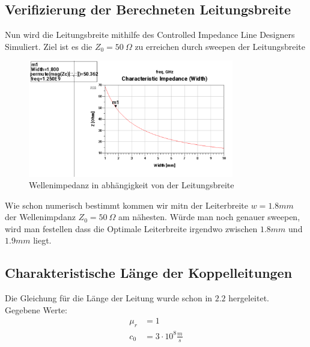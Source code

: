        

    \subsection{Verifizierung der Berechneten Leitungsbreite}
    Nun wird die Leitungsbreite mithilfe des Controlled Impedance Line Designers Simuliert.
    Ziel ist es die $Z_0 = 50~\Omega$ zu erreichen durch sweepen der Leitungsbreite
    \begin{figure}[H]
        \centering
        \includegraphics[width=0.8\textwidth]{Pictures/LeitungsbreitenSweep.png}
        \caption{Wellenimpedanz in abhängigkeit von der Leitungsbreite}
    \end{figure}
    Wie schon numerisch bestimmt kommen wir mitn der Leiterbreite $w=1.8mm$ der Wellenimpdanz $Z_0 = 50~\Omega$
    am nähesten. Würde man noch genauer sweepen, wird man festellen dass die Optimale Leiterbreite irgendwo zwischen
    $1.8mm$ und $1.9mm$ liegt.

        \subsection{Charakteristische Länge der Koppelleitungen}
    Die Gleichung für die Länge der Leitung wurde schon in $2.2$ hergeleitet.
    \\Gegebene Werte:
    \begin{align}
        \mu_r &= 1 \\
        c_0 &= 3 \cdot 10^8 \frac{m}{s}
    \end{align}

